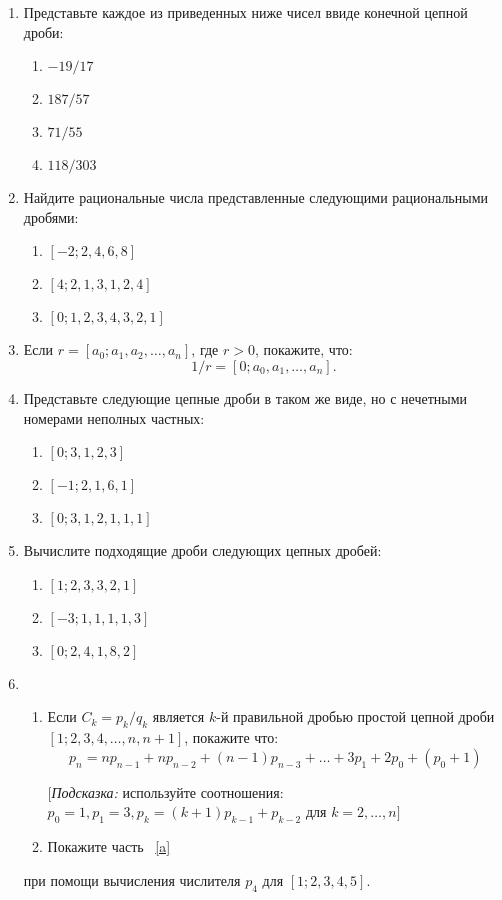 \documentclass[11pt]{article}
\begin{document}
\begin{enumerate}
\item Представьте каждое из приведенных ниже чисел ввиде конечной цепной дроби:
\begin{enumerate}
\item$-19/17$  \item$187/57$  \item$71/55$  \item$118/303$
	\end{enumerate}	

		\item Найдите рациональные числа представленные следующими рациональными дробями:
			\begin{enumerate}
			\item$[-2;2,4,6,8]$ \item$[4;2,1,3,1,2,4]$ \item$[0;1,2,3,4,3,2,1]$
	\end{enumerate}	
				\item Если $r=[a_0;a_1,a_2,\dots,a_n]$, где $r>0$, покажите, что:
				 $$1/r=[0;a_0,a_1,\dots,a_n].$$
				 \item Представьте следующие цепные дроби в таком же виде, но с нечетными номерами неполных частных:
			\begin{enumerate}
				\item$[0;3,1,2,3]$ \item$[-1;2,1,6,1]$ \item$[0;3,1,2,1,1,1]$
	\end{enumerate}	 
		\item Вычислите подходящие дроби следующих цепных дробей:
\begin{enumerate}
			\item$[1;2,3,3,2,1]$ \item$[-3;1,1,1,1,3]$ \item$[0;2,4,1,8,2]$
	\end{enumerate}	 
	\item \begin{enumerate} \item \label{a} Если $C_k=p_k/q_k$ является $k$-й правильной дробью простой цепной дроби $[1;2,3,4,\dots,n,n+1]$, покажите что:
	$$p_n=np_{n-1}+np_{n-2}+(n-1)p_{n-3}+\dots+3p_1+2p_0+(p_0+1)$$
	\begin{center}
		[\textit{Подсказка:} используйте соотношения: $p_0=1,p_1=3,p_k=(k+1)p_{k-1}+p_{k-2}$ для $k=2,\dots,n]$
		\end{center}
	\item Покажите часть ~\ref{a} 	\end{enumerate}	 при помощи вычисления числителя $p_4$ для $[1;2,3,4,5]$.

\end{enumerate}
\end{document}

